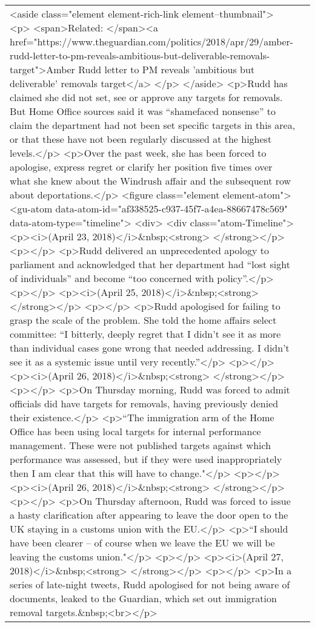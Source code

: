 \documentclass[]{article}
\begin{document}
\begin{table}[!h]
{\begin{tabular}[t]{ll}
<aside class="element element-rich-link element--thumbnail"> 
 <p> <span>Related: </span><a href="https://www.theguardian.com/politics/2018/apr/29/amber-rudd-letter-to-pm-reveals-ambitious-but-deliverable-removals-target">Amber Rudd letter to PM reveals 'ambitious but deliverable' removals target</a> </p> 
</aside> 
<p>Rudd has claimed she did not set, see or approve any targets for removals. But Home Office sources said it was “shamefaced nonsense” to claim the department had not been set specific targets in this area, or that these have not been regularly discussed at the highest levels.</p> 
<p>Over the past week, she has been forced to apologise, express regret or clarify her position five times over what she knew about the Windrush affair and the subsequent row about deportations.</p> 
<figure class="element element-atom"> 
 <gu-atom data-atom-id="af338525-c937-45f7-a4ea-88667478c569" data-atom-type="timeline"> 
  <div>
   <div class="atom-Timeline">
    <p><i>(April 23, 2018)</i>\&nbsp;<strong> </strong></p>
    <p></p>
    <p>Rudd delivered an unprecedented apology to parliament and acknowledged that her department had “lost sight of individuals” and become “too concerned with policy”.</p>
    <p></p>
    <p><i>(April 25, 2018)</i>\&nbsp;<strong> </strong></p>
    <p></p>
    <p>Rudd apologised for failing to grasp the scale of the problem. She told the home affairs select committee: “I bitterly, deeply regret that I didn’t see it as more than individual cases gone wrong that needed addressing. I didn’t see it as a systemic issue until very recently.”</p>
    <p></p>
    <p><i>(April 26, 2018)</i>\&nbsp;<strong> </strong></p>
    <p></p>
    <p>On Thursday morning, Rudd was forced to admit officials did have targets for removals, having previously denied their existence.</p>
    <p>“The immigration arm of the Home Office has been using local targets for internal performance management. These were not published targets against which performance was assessed, but if they were used inappropriately then I am clear that this will have to change."</p>
    <p></p>
    <p><i>(April 26, 2018)</i>\&nbsp;<strong> </strong></p>
    <p></p>
    <p>On Thursday afternoon, Rudd was forced to issue a hasty clarification after appearing to leave the door open to the UK staying in a customs union with the EU.</p>
    <p>“I should have been clearer – of course when we leave the EU we will be leaving the customs union."</p>
    <p></p>
    <p><i>(April 27, 2018)</i>\&nbsp;<strong> </strong></p>
    <p></p>
    <p>In a series of late-night tweets, Rudd apologised for not being aware of documents, leaked to the Guardian, which set out immigration removal targets.\&nbsp;<br></p>

\end{tabular}}
\end{table}
\end{document}
